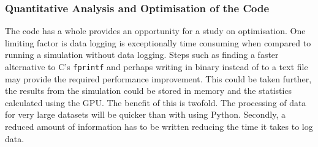 \documentclass[../Interim_Report_Master]{subfiles}
\begin{document}
\subsubsection{Quantitative Analysis and Optimisation of the Code}
The code has a whole provides an opportunity for a study on optimisation. One limiting factor is data logging is exceptionally time consuming when compared to running a simulation without data logging. Steps such as finding a faster alternative to C's \lstinline[style=cstyleintext]|fprintf| and perhaps writing in binary instead of to a text file may provide the required performance improvement. This could be taken further, the results from the simulation could be stored in memory and the statistics calculated using the GPU. The benefit of this is twofold. The processing of data for very large datasets will be quicker than with using Python. Secondly, a reduced amount of information has to be written reducing the time it takes to log data. 
\end{document}
